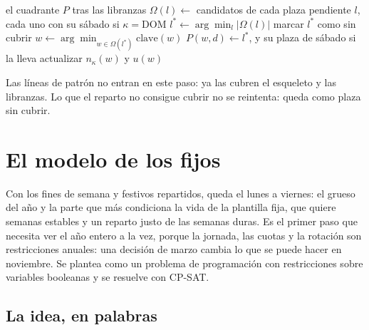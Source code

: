 \documentclass[11pt,a4paper]{article}
\begin{document}
\begin{algorithm}[ht]
\caption{Reparto de sábados, domingos y festivos}
\label{alg:findes}
\begin{algorithmic}[1]
  \Require el cuadrante $P$ tras las libranzas
        \State $\Omega(l) \gets$ candidatos de cada plaza pendiente $l$, cada uno con su sábado
               si $\kappa = \mathrm{DOM}$
        \State $l^\ast \gets \arg\min_l |\Omega(l)|$
          \State marcar $l^\ast$ como sin cubrir
        \Else
          \State $w \gets \arg\min_{w \in \Omega(l^\ast)} \mathrm{clave}(w)$
          \State $P(w,d) \gets l^\ast$, y su plaza de sábado si la lleva
          \State actualizar $n_\kappa(w)$ y $u(w)$
        \EndIf
      \EndWhile
    \EndFor
  \EndFor
\end{algorithmic}
\end{algorithm}

Las líneas de patrón no entran en este paso: ya las cubren el esqueleto y las libranzas. Lo que
el reparto no consigue cubrir no se reintenta: queda como plaza sin cubrir.

\section{El modelo de los fijos}
\label{sec:fijos}

Con los fines de semana y festivos repartidos, queda el lunes a viernes: el grueso del año y la
parte que más condiciona la vida de la plantilla fija, que quiere semanas estables y un reparto
justo de las semanas duras. Es el primer paso que necesita ver el año entero a la vez, porque la
jornada, las cuotas y la rotación son restricciones anuales: una decisión de
marzo cambia lo que se puede hacer en noviembre. Se plantea como un problema de programación con
restricciones sobre variables booleanas y se resuelve con CP-SAT.

\subsection{La idea, en palabras}
\end{document}
